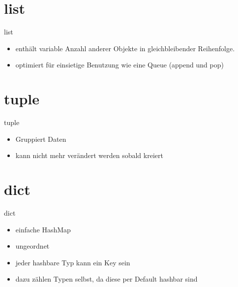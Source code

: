 \section{list}
\begin{frame}{list}

\begin{itemize}
	\item enthält variable Anzahl anderer Objekte in gleichbleibender Reihenfolge.
	\item optimiert für einsietige Benutzung wie eine Queue (append und pop)
\end{itemize}
\end{frame}
\begin{frame}{}
	
\end{frame}

\section{tuple}
\begin{frame}{tuple}
\begin{itemize}
	\item Gruppiert Daten
	\item kann nicht mehr verändert werden sobald kreiert
\end{itemize}
\end{frame}
\begin{frame}{}
	
\end{frame}


\section{dict}
\begin{frame}{dict}
\begin{itemize}
	\item einfache HashMap
	\item ungeordnet
	\item jeder hashbare Typ kann ein Key sein
	\item dazu zählen Typen selbst, da diese per Default hashbar sind
\end{itemize}
\end{frame}
\begin{frame}{}

\end{frame}

